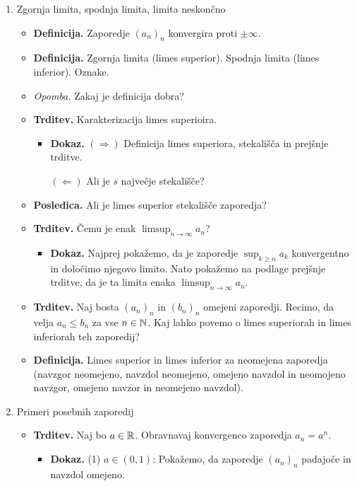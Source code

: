 \begin{enumerate}
    \item Zgornja limita, spodnja limita, limita neskončno
    \begin{itemize}
        \item \colorbox{purple!30}{\textbf{Definicija.}} Zaporedje $(a_n)_n$ konvergira proti $\pm \infty$.
        \item \colorbox{purple!30}{\textbf{Definicija.}} Zgornja limita (limes superior). Spodnja limita (limes inferior). Oznake.
        \item \colorbox{yellow!30}{\emph{Opomba.}} Zakaj je definicija dobra?
        \item \colorbox{blue!30}{\textbf{Trditev.}}  Karakterizacija limes superioira. 
        \begin{itemize}
            \item \colorbox{green!30}{\textbf{Dokaz.}} $(\Rightarrow)$ Definicija limes superiora, stekališča in prejšnje trditve.
            
            $(\Leftarrow)$ Ali je $s$ največje stekališče?
        \end{itemize}  
        \item \colorbox{orange!30}{\textbf{Posledica.}} Ali je limes superior stekališče zaporedja?
        \item \colorbox{blue!30}{\textbf{Trditev.}}  Čemu je enak $\limsup_{n \to \infty} a_n$?
        \begin{itemize}
            \item \colorbox{green!30}{\textbf{Dokaz.}} Najprej pokažemo, da je zaporedje $\sup_{k \geq n}a_k$ konvergentno in določimo njegovo limito. Nato pokažemo na podlage prejšnje trditve, da je ta limita enaka $\limsup_{n \to \infty} a_n$.
        \end{itemize}  
        \item \colorbox{blue!30}{\textbf{Trditev.}}  Naj bosta $(a_n)_n$ in $(b_n)_n$ omejeni zaporedji. Recimo, da velja $a_n \leq b_n$ za vse $n \in \mathbb{N}$. Kaj lahko povemo o limes superiorah in limes inferiorah teh zaporedij?
        \item \colorbox{purple!30}{\textbf{Definicija.}} Limes superior in limes inferior za neomejena zaporedja (navzgor neomejeno, navzdol neomejeno, omejeno navzdol in neomojeno navzgor, omejeno navzor in neomejeno navzdol).
    \end{itemize}

    \newpage
    \item Primeri posebnih zaporedij
    \begin{itemize}
        \item \colorbox{blue!30}{\textbf{Trditev.}}  Naj bo $a \in \mathbb{R}$. Obravnavaj konvergenco zaporedja $a_n = a^n$.
        \begin{itemize}
            \item \colorbox{green!30}{\textbf{Dokaz.}} (1) $a \in (0, 1)$: Pokažemo, da zaporedje $(a_n)_n$ padajoče in navzdol omejeno.
            

\end{itemize}
\end{itemize}
\end{enumerate}
